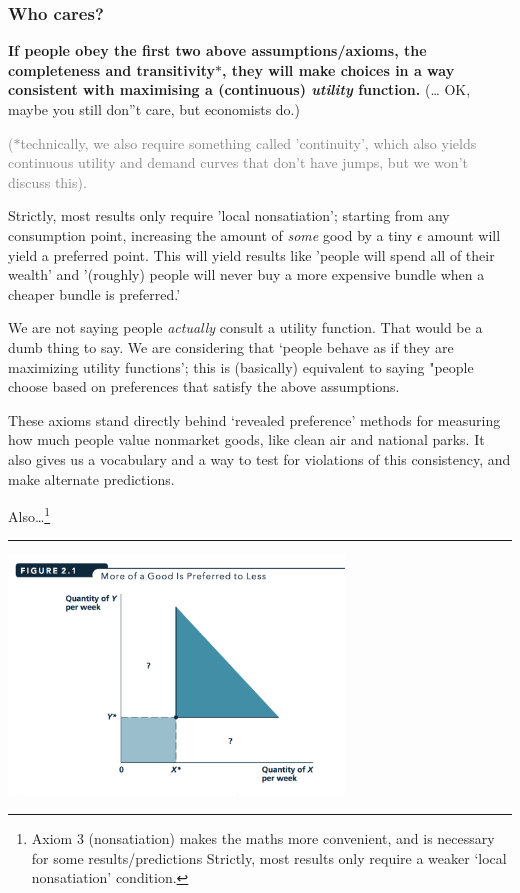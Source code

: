 \documentclass[]{article}
\begin{document}
\hypertarget{who-cares}{%
\subsubsection{Who cares?}\label{who-cares}}

\textbf{If people obey the first two above assumptions/axioms, the
completeness and transitivity\(\ast\), they will make choices in a way
consistent with maximising a (continuous) \emph{utility} function.}
(\ldots{} OK, maybe you still don''t care, but economists do.)

\textcolor{gray}{($\ast$technically, we also require something called 'continuity', which also yields continuous utility and demand curves that don't have jumps,  but we won't discuss this).}

\textcolor{RawSienna}{Strictly, most results only require 'local nonsatiation'; starting from any consumption point, increasing the amount of \emph{some} good by a tiny $\epsilon$ amount will yield a preferred point. This will yield results like 'people will spend all of their wealth' and '(roughly) people will never buy a more expensive bundle when a cheaper bundle is preferred.'}

We are not saying people \emph{actually} consult a utility function.
That would be a dumb thing to say. We are considering that `people
behave as if they are maximizing utility functions'; this is (basically)
equivalent to saying "people choose based on preferences that satisfy
the above assumptions.

These axioms stand directly behind `revealed preference' methods for
measuring how much people value nonmarket goods, like clean air and
national parks. It also gives us a vocabulary and a way to test for
violations of this consistency, and make alternate predictions.

\bigskip

Also\ldots{}\footnote{Axiom 3 (nonsatiation) makes the maths more
  convenient, and is necessary for some results/predictions Strictly,
  most results only require a weaker `local nonsatiation' condition.}

\begin{center}\rule{0.5\linewidth}{\linethickness}\end{center}

\includegraphics[height=2.5in]{picsfigs/moreisbetter.png}
\end{document}
